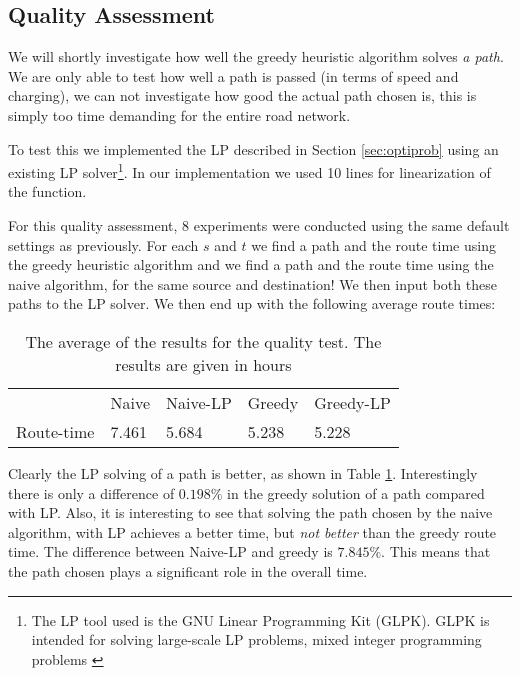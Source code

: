 \subsection{Quality Assessment}
We will shortly investigate how well the greedy heuristic algorithm solves \emph{a path}. We are only able to test how well a path is passed (in terms of speed and charging), we can not investigate how good the actual path chosen is, this is simply too time demanding for the entire road network.

To test this we implemented the LP described in Section \ref{sec:optiprob} using an existing LP solver\footnote{The LP tool used is the GNU Linear Programming Kit (GLPK). GLPK is intended for solving large-scale LP problems, mixed integer programming problems \cite{glpk}}. In our implementation we used 10 lines for linearization of the function. 

For this quality assessment, 8 experiments were conducted using the same default settings as previously. For each $s$ and $t$ we find a path and the route time using the greedy heuristic algorithm and we find a path and the route time using the naive algorithm, for the same source and destination! We then input both these paths to the LP solver. We then end up with the following average route times:
\begin{table}[!htb]
\begin{tabular}{ p{1cm} p{1.35cm} p{1.35cm} p{1.25cm} p{1.6cm}}
\hline
& Naive & Naive-LP  & Greedy  & Greedy-LP \\
Route-time & 7.461& 5.684 & 5.238 & 5.228\\
\hline
\end{tabular}
\caption{The average of the results for the quality test. The results are given in hours}
\label{tab:LP}
\end{table}

Clearly the LP solving of a path is better, as shown in Table \ref{tab:LP}. Interestingly there is only a difference of $0.198\%$ in the greedy solution of a path compared with LP. Also, it is interesting to see that solving the path chosen by the naive algorithm, with LP achieves a better time, but \emph{not better} than the greedy route time. The difference between Naive-LP and greedy is $7.845\%$. This means that the path chosen plays a significant role in the overall time.